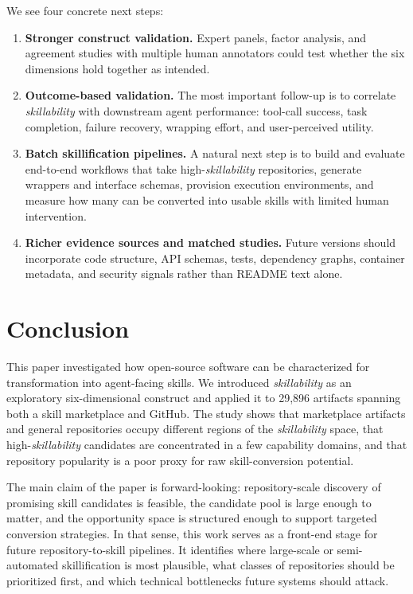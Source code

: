 \documentclass[sigconf,review,anonymous,nonacm]{acmart}
\newcommand{\skillability}{\textit{skillability}\xspace}
\begin{document}
We see four concrete next steps:
\begin{enumerate}[leftmargin=*,itemsep=2pt]
    \item \textbf{Stronger construct validation.} Expert panels, factor analysis, and agreement studies with multiple human annotators could test whether the six dimensions hold together as intended.
    \item \textbf{Outcome-based validation.} The most important follow-up is to correlate \skillability with downstream agent performance: tool-call success, task completion, failure recovery, wrapping effort, and user-perceived utility.
    \item \textbf{Batch skillification pipelines.} A natural next step is to build and evaluate end-to-end workflows that take high-\skillability repositories, generate wrappers and interface schemas, provision execution environments, and measure how many can be converted into usable skills with limited human intervention.
    \item \textbf{Richer evidence sources and matched studies.} Future versions should incorporate code structure, API schemas, tests, dependency graphs, container metadata, and security signals rather than README text alone.
\end{enumerate}

\section{Conclusion}

This paper investigated how open-source software can be characterized for transformation into agent-facing skills. We introduced \skillability as an exploratory six-dimensional construct and applied it to 29,896 artifacts spanning both a skill marketplace and GitHub. The study shows that marketplace artifacts and general repositories occupy different regions of the \skillability space, that high-\skillability candidates are concentrated in a few capability domains, and that repository popularity is a poor proxy for raw skill-conversion potential.

The main claim of the paper is forward-looking: repository-scale discovery of promising skill candidates is feasible, the candidate pool is large enough to matter, and the opportunity space is structured enough to support targeted conversion strategies. In that sense, this work serves as a front-end stage for future repository-to-skill pipelines. It identifies where large-scale or semi-automated skillification is most plausible, what classes of repositories should be prioritized first, and which technical bottlenecks future systems should attack.
\end{document}
